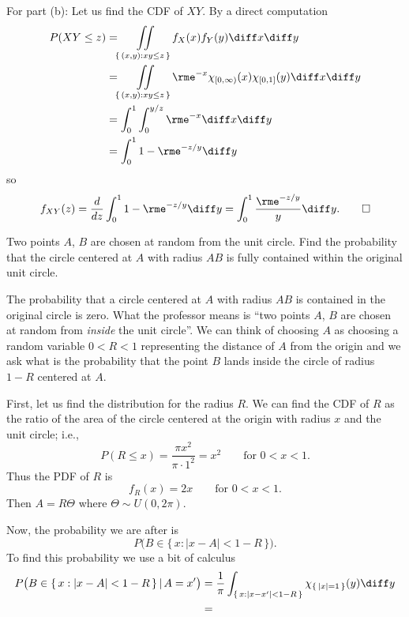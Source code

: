 \begin{solution}
  For part (b): Let us find the CDF of \(XY\). By a direct computation
  \begin{align*}
    P(XY\leq z)
    &=\iint\limits_{\{\,(x,y):xy\leq z\,\}} f_X(x)f_Y(y)\diff x\diff y\\
    &=\iint\limits_{\{\,(x,y):xy\leq z\,\}} \rme^{-x}\chi_{[0,\infty)}(x)\chi_{[0,1]}(y)
      \diff x\diff y\\
    &=\int_0^1\int_0^{y/z}\rme^{-x}\diff x\diff y\\
    &=\int_0^1 1-\rme^{-z/y}\diff y
  \end{align*}
  so
  \[
    f_{XY}(z)=\frac{d}{dz}\int_0^1 1-\rme^{-z/y}\diff
    y=\int_0^1\frac{\rme^{-z/y}}{y}\diff y.\qedhere
  \]
\end{solution}
\newpage

\begin{problem}[Handout 17, \# 18]
  Two points \(A\), \(B\) are chosen at random from the unit circle. Find
  the probability that the circle centered at \(A\) with radius \(AB\) is
  fully contained within the original unit circle.
\end{problem}
\begin{solution}
  The probability that a circle centered at \(A\) with radius \(AB\) is
  contained in the original circle is zero. What the professor means is
  ``two points \(A\), \(B\) are chosen at random from \emph{inside} the
  unit circle''. We can think of choosing \(A\) as choosing a random
  variable \(0<R<1\) representing the distance of \(A\) from the origin and
  we ask what is the probability that the point \(B\) lands inside the
  circle of radius \(1-R\) centered at \(A\).

  First, let us find the distribution for the radius \(R\). We can find the
  CDF of \(R\) as the ratio of the area of the circle centered at the
  origin with radius \(x\) and the unit circle; i.e.,
  \[
    P(R\leq x)=\frac{\pi x^2}{\pi\cdot 1^2}=x^2\qquad \text{for \(0<x<1\).}
  \]
  Thus the PDF of \(R\) is
  \[
    f_R(x)=2x\qquad\text{for \(0<x<1\).}
  \]
  Then \(A=R\Theta\) where \(\Theta\sim U(0,2\pi)\).

  Now, the probability we are after is
  \[
    P\bigl(B\in\{\,x:|x-A|<1-R\,\}\bigr).
  \]
  To find this probability we use a bit of calculus
  \begin{align*}
    P\bigl(B\in\{\,x:|x-A|<1-R\,\}\,|\,A=x'\bigr)
    &=\frac{1}{\pi}\int_{\{\,x:|x-x'|<1-R\,\}}\chi_{\{\,|x|=1\,\}}(y)\diff
      y\\
    &=
  \end{align*}
\end{solution}
\newpage

